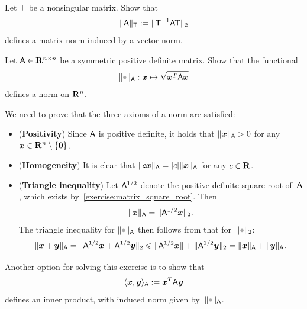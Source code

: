 \begin{exercise}
    \label{exercise:induced_matrix_norm}
    Let $\mathsf T$ be a nonsingular matrix.
    Show that
    \[
        \lVert\mathsf A\rVert_{\mathsf T} := \lVert\mathsf T^{-1} \mathsf A \mathsf T\rVert_2
    \]
    defines a matrix norm induced by a vector norm.
\end{exercise}

\begin{exercise}
    \label{exercise:linear_norm_induced_A}
    Let $\mathsf A \in \mathbf R^{n \times n}$ be a symmetric positive definite matrix.
    Show that the functional
    \[
        \norm{\placeholder}_{\mat A}: \vect x \mapsto \sqrt{\vect x^\t \mat A \vect x}
    \]
    defines a norm on $\mathbf R^n$.
\end{exercise}
\begin{solution}
    We need to prove that the three axioms of a norm are satisfied:
    \begin{itemize}
        \item 
            (\textbf{Positivity})
            Since $\mathsf A$ is positive definite,
            it holds that $\lVert\mathbf{\boldsymbol{x}}\rVert_{\mathsf A} > 0$ for any $\mathbf{\boldsymbol{x}} \in \mathbf R^{n} \setminus \{\mathbf{\boldsymbol{0}}\}$.

        \item 
            (\textbf{Homogeneity})
            It is clear that $\lVert c \mathbf{\boldsymbol{x}}\rVert_{\mathsf A} = |c| \lVert\mathbf{\boldsymbol{x}}\rVert_{\mathsf A}$ for any $c \in \mathbf R$.

        \item
            (\textbf{Triangle inequality})
            Let $\mathsf A^{1/2}$ denote the positive definite square root of~$\mathsf A$,
            which exists by~\cref{exercise:matrix_square_root}.
            Then 
            \[
                \lVert\mathbf{\boldsymbol{x}}\rVert_{\mathsf A} = \lVert\mathsf A^{1/2} \mathbf{\boldsymbol{x}}\rVert_2.
            \]
            The triangle inequality for $\norm{\placeholder}_{\mat A}$ then follows from that for~$\norm{\placeholder}_2$:
            \[
                \lVert\mathbf{\boldsymbol{x}} + \mathbf{\boldsymbol{y}}\rVert_{\mathsf A}
                = \lVert\mathsf A^{1/2} \mathbf{\boldsymbol{x}} + \mathsf A^{1/2} \mathbf{\boldsymbol{y}}\rVert_2
                \leqslant \lVert\mathsf A^{1/2} \mathbf{\boldsymbol{x}}\rVert + \lVert\mathsf A^{1/2} \mathbf{\boldsymbol{y}}\rVert_2
                = \lVert\mathbf{\boldsymbol{x}}\rVert_{\mathsf A} + \lVert\mathbf{\boldsymbol{y}}\rVert_{\mathsf A}.
            \]
    \end{itemize}
    Another option for solving this exercise is to show that
    \[
        \langle\mathbf{\boldsymbol{x}}, \mathbf{\boldsymbol{y}}\rangle_{\mathsf A} := \mathbf{\boldsymbol{x}}^T \mathsf A \mathbf{\boldsymbol{y}}
    \]
    defines an inner product,
    with induced norm given by~$\norm{\placeholder}_{\mat A}$.
\end{solution}

